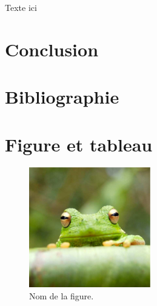 \documentclass[9pt,twocolumn,twoside,]{pnas-new}
\begin{document}
Texte ici

\hypertarget{conclusion}{%
\section{Conclusion}\label{conclusion}}

\hypertarget{bibliographie}{%
\section{Bibliographie}\label{bibliographie}}

\hypertarget{figure-et-tableau}{%
\section{Figure et tableau}\label{figure-et-tableau}}

\begin{figure}
\centering
\includegraphics{frog.png}
\caption{Nom de la figure.{}}
\end{figure}



% 
\end{document}
